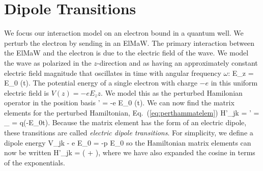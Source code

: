 \section{Dipole Transitions}
\label{sec:dipoletrans}
We focus our interaction model on an electron bound in a quantum well. We perturb the electron by sending in an ElMaW. The primary interaction between the ElMaW and the electron is due to the electric field of the wave. We model the wave as polarized in the $z$-direction and as having an approximately constant electric field magnitude that oscillates in time with angular frequency $\omega$:
\beq
E_z = E_0 \cos(\omega t).
\eeq
The potential energy of a single electron with charge $-e$ in this uniform electric field is $V(z) = -e E_z z$. We model this as the perturbed Hamilonian operator in the position basis
\beq
{}' = -e E_0  \cos(\omega t). 
\eeq
We can now find the matrix elements for the perturbed Hamiltonian, Eq.~(\ref{eq:perthammatelem})
\beq
H'_{jk} = ' = _{\displaystyle {}  = q}\left(-E_0\cos\omega t\right).
\label{eq:hjkdipole}
\eeq
Because the matrix element has the form of an electric dipole, these transitions are called {\em electric dipole transitions}. For simplicity, we define a dipole energy 
\beq
V_{jk} \equiv - e E_0 = -p E_0
\eeq
so the Hamiltonian matrix elements can now  be written
\beq
H'_{jk} = \left( + \right),
\label{eq:hammatdipole}
\eeq
where we have also expanded the cosine in terms of the exponentials. 

